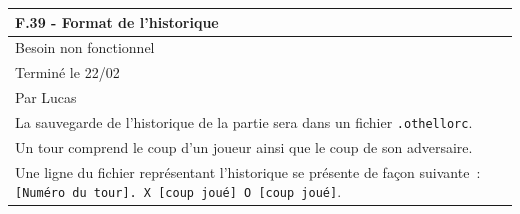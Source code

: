 \documentclass[a4paper,12pt]{article}
\begin{document}
\vspace{1cm}

\noindent
\setlength{\arrayrulewidth}{1.5pt}
\renewcommand{\arraystretch}{1.5}
\begin{tabularx}{\textwidth}{|X|}
    \hline
    \textbf{F.39 - Format de l’historique}                                                                                                                                                                                                                                                   \\
    \hline
    Besoin non fonctionnel                                                                                                                                                                                                                                                                   \\
    \hline
    Terminé le 22/02                                                                                                                                                                                                                                                                         \\
    Par Lucas                                                                                                                                                                                                                                                                                \\
    \hline
    La sauvegarde de l’historique de la partie sera dans un fichier \texttt{.othellorc}.                                                                                                                                                                                                     \\
    Un tour comprend le coup d’un joueur ainsi que le coup de son adversaire.                                                                                                                                                                                                                \\
    Une ligne du fichier représentant l’historique se présente de façon suivante~: \texttt{[Numéro du tour]. X [coup joué] O [coup joué]}.                                                                                                                                                   \\

\end{tabularx}
\end{document}

